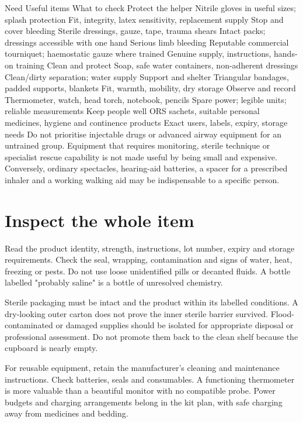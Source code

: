 \documentclass[10pt,openright]{book}
\begin{document}
Need Useful items What to check Protect the helper Nitrile gloves in useful sizes; splash protection Fit, integrity, latex sensitivity, replacement supply Stop and cover bleeding Sterile dressings, gauze, tape, trauma shears Intact packs; dressings accessible with one hand Serious limb bleeding Reputable commercial tourniquet; haemostatic gauze where trained Genuine supply, instructions, hands-on training Clean and protect Soap, safe water containers, non-adherent dressings Clean/dirty separation; water supply Support and shelter Triangular bandages, padded supports, blankets Fit, warmth, mobility, dry storage Observe and record Thermometer, watch, head torch, notebook, pencils Spare power; legible units; reliable measurements Keep people well ORS sachets, suitable personal medicines, hygiene and continence products Exact users, labels, expiry, storage needs Do not prioritise injectable drugs or advanced airway equipment for an untrained group. Equipment that requires monitoring, sterile technique or specialist rescue capability is not made useful by being small and expensive. Conversely, ordinary spectacles, hearing-aid batteries, a spacer for a prescribed inhaler and a working walking aid may be indispensable to a specific person.

\section*{Inspect the whole item}
Read the product identity, strength, instructions, lot number, expiry and storage requirements. Check the seal, wrapping, contamination and signs of water, heat, freezing or pests. Do not use loose unidentified pills or decanted fluids. A bottle labelled "probably saline" is a bottle of unresolved chemistry.

Sterile packaging must be intact and the product within its labelled conditions. A dry-looking outer carton does not prove the inner sterile barrier survived. Flood-contaminated or damaged supplies should be isolated for appropriate disposal or professional assessment. Do not promote them back to the clean shelf because the cupboard is nearly empty.

For reusable equipment, retain the manufacturer's cleaning and maintenance instructions. Check batteries, seals and consumables. A functioning thermometer is more valuable than a beautiful monitor with no compatible probe. Power budgets and charging arrangements belong in the kit plan, with safe charging away from medicines and bedding.
\end{document}
